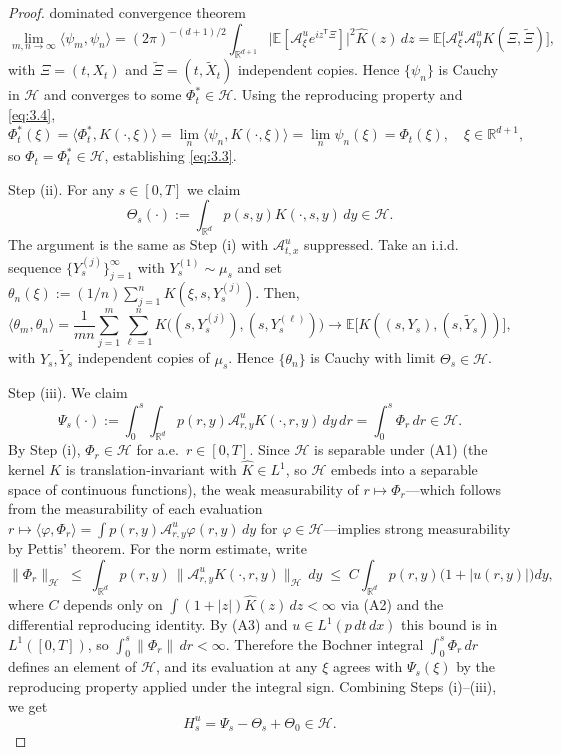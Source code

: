 \documentclass[11pt,leqno]{article}
\theoremstyle{plain}
\theoremstyle{remark}
\theoremstyle{definition}
\numberwithin{equation}{section}
\numberwithin{figure}{section}
\numberwithin{table}{section}
\begin{document}
\begin{proof}
dominated convergence theorem
\[
 \lim_{m,n\to\infty}\langle\psi_m,\psi_n\rangle
 = (2\pi)^{-(d+1)/2}\int_{\mathbb{R}^{d+1}}\bigl|\mathbb{E}[\mathcal{A}^u_\xi e^{iz^{\mathsf{T}}\Xi}]\bigr|^2\widehat{K}(z)\,dz
 = \mathbb{E}\bigl[\mathcal{A}^u_{\xi}\mathcal{A}^u_{\eta}K(\Xi,\tilde\Xi)\bigr],
\]
with $\Xi=(t,X_t)$ and $\tilde\Xi=(t,\tilde X_t)$ independent copies.
Hence $\{\psi_n\}$ is Cauchy in $\mathcal{H}$ and converges to some
$\Phi_t^\ast\in\mathcal{H}$.  Using the reproducing property and
\eqref{eq:3.4},
\[
 \Phi_t^\ast(\xi) = \langle\Phi_t^\ast,K(\cdot,\xi)\rangle
 = \lim_n\langle\psi_n,K(\cdot,\xi)\rangle
 = \lim_n\psi_n(\xi) = \Phi_t(\xi), \quad \xi\in\mathbb{R}^{d+1},
\]
so $\Phi_t=\Phi_t^\ast\in\mathcal{H}$, establishing \eqref{eq:3.3}.

Step (ii). For any $s\in[0,T]$ we claim
\begin{equation}\label{eq:Omega-in-H}
 \Theta_s(\cdot):=\int_{\mathbb{R}^d}p(s,y)K(\cdot,s,y)\,dy\in\mathcal{H}.
\end{equation}
The argument is the same as Step (i) with $\mathcal{A}^u_{t,x}$
suppressed. Take an i.i.d. sequence $\{Y_s^{(j)}\}_{j=1}^{\infty}$ with $Y_s^{(1)}\sim \mu_s$ and set
$\theta_n(\xi):= (1/n)\sum_{j=1}^n K(\xi,s,Y_s^{(j)})$. Then, 
\[
 \langle\theta_m,\theta_n\rangle
 = \frac{1}{mn}\sum_{j=1}^m\sum_{\ell=1}^n K\bigl((s,Y_s^{(j)}),(s,Y_s^{(\ell)})\bigr)
 \longrightarrow \mathbb{E}\bigl[K((s,Y_s),(s,\tilde Y_s))\bigr],
\]
with $Y_s,\tilde Y_s$ independent copies of $\mu_s$. Hence $\{\theta_n\}$ is
Cauchy with limit $\Theta_s\in\mathcal{H}$.

Step (iii). We claim
\begin{equation}\label{eq:Psi-in-H}
 \Psi_s(\cdot):=\int_0^s\int_{\mathbb{R}^d}p(r,y)\mathcal{A}^u_{r,y}K(\cdot,r,y)\,dy\,dr
 = \int_0^s\Phi_r\,dr \in\mathcal{H}.
\end{equation}
By Step (i), $\Phi_r\in\mathcal{H}$ for a.e.\ $r\in[0,T]$.  Since
$\mathcal{H}$ is separable under (A1) (the kernel $K$ is
translation-invariant with $\widehat K\in L^1$, so $\mathcal{H}$
embeds into a separable space of continuous functions), the
weak measurability of $r\mapsto\Phi_r$---which follows from the
measurability of each evaluation $r\mapsto\langle\varphi,\Phi_r\rangle
=\int p(r,y)\mathcal{A}^u_{r,y}\varphi(r,y)\,dy$ for $\varphi\in\mathcal{H}$---implies
strong measurability by Pettis' theorem.  For the norm estimate, write
\[
 \|\Phi_r\|_{\mathcal{H}}
 \;\le\;\int_{\mathbb{R}^d}p(r,y)\,\bigl\|\mathcal{A}^u_{r,y}K(\cdot,r,y)\bigr\|_{\mathcal{H}}\,dy
 \;\le\;C\!\int_{\mathbb{R}^d}p(r,y)\bigl(1+|u(r,y)|\bigr)dy,
\]
where $C$ depends only on $\int(1+|z|)\widehat K(z)\,dz<\infty$ via
(A2) and the differential reproducing identity.  By (A3) and
$u\in L^1(p\,dt\,dx)$ this bound is in $L^1([0,T])$, so
$\int_0^s\|\Phi_r\|\,dr<\infty$.  Therefore the Bochner integral
$\int_0^s\Phi_r\,dr$ defines an element of $\mathcal{H}$, and its
evaluation at any $\xi$ agrees with $\Psi_s(\xi)$ by the reproducing
property applied under the integral sign.  Combining Steps (i)--(iii), we get 
\[
 H_s^u = \Psi_s - \Theta_s + \Theta_0 \in\mathcal{H}.
\]


\end{proof}
\end{document}

